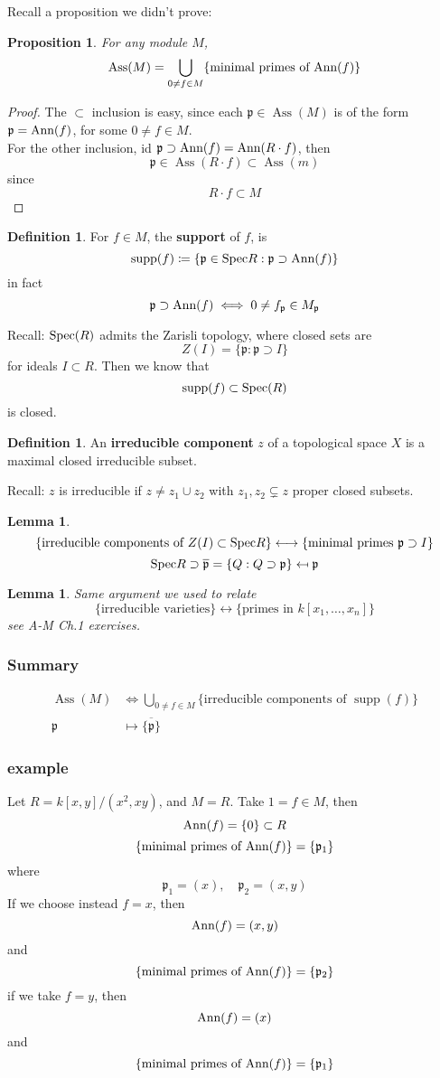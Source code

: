 \documentclass[12pt]{article}
\newcommand{\spec}{\textup{Spec}}
\newcommand{\ann}[1]{\textup{Ann}(#1)}
\DeclareMathOperator{\Ass}{Ass}
\DeclareMathOperator{\supp}{supp}
\def\p{\mathfrak{p}}
\newtheorem{lemma}[theorem]{Lemma}
\newtheorem{prop}[theorem]{Proposition}
\theoremstyle{definition}
\newtheorem{definition}[theorem]{Definition}
\begin{document}
Recall a proposition we didn't prove:
\begin{prop}
For any module $M$,
\[
\Ass(M) = \bigcup_{0\neq f \in M}\{ \text{minimal primes of }\ann{f}\}
\]
\end{prop}
\begin{proof}
The $\subset $ inclusion is easy, since each $\p \in \Ass(M)$ is of the form $\p = \ann{f}$, for some $0\neq f \in M$.\\
For the other inclusion, id $\p \supset \ann{f} = \ann{R\cdot f}$, then
\[
\p \in \Ass(R\cdot f) \subset \Ass(m)
\]
since
\[
R\cdot f \subset M
\]
\end{proof}
\begin{definition}
For $f\in M$, the \textbf{support} of $f$, is
\[
\supp(f)\coloneqq\{\p \in \spec{R}: \p \supset \ann{f}\}
\]
in fact
\[
\p \supset \ann{f} \iff 0\neq f_\p \in M_\p
\]
\end{definition}
Recall: $\spec(R)$ admits the Zarisli topology, where closed sets are
\[
Z(I) = \{\p : \p\supset I\}
\]
for ideals $I \subset R$. Then we know that
\[
\supp(f) \subset \spec(R)
\]
is closed.\\
\begin{definition}
An \textbf{irreducible component} $z$ of a topological space $X$ is a maximal closed irreducible subset.
\end{definition}
Recall: $z$ is irreducible if $z\neq z_1 \cup z_2$ with $z_1,z_2 \subsetneq z$ proper closed subsets. 
\begin{lemma}
\[
\{\text{irreducible components of }Z(I) \subset \spec{R}\} \longleftrightarrow \{\text{minimal primes }\p\supset I\}
\]
\[
\spec{R} \supset \overline{\p} = \{Q: Q\supset \p\} \mapsfrom \p
\]
\end{lemma}
\begin{lemma}
Same argument we used to relate 
\[
\{\text{irreducible varieties}\} \longleftrightarrow \{\text{primes in } k[x_1,\dots, x_n]\}
\]
see A-M Ch.1 exercises.
\end{lemma}
\subsubsection*{Summary}
\begin{align}
    \Ass(M) &\Longleftrightarrow \bigcup_{0\neq f \in M}\{\text{irreducible components of }\supp(f)\}\\
    \p &\mapsto \overline{\{\p\}}
\end{align}

\subsubsection*{example}
Let $R = k[x,y]/(x^2,xy)$, and $M= R$. Take $1=f \in M$, then
\[
\ann{f} = \{0\} \subset R
\]
\[
\{\text{minimal primes of }\ann{f}\} = \{\p_1\}
\]
where
\[
\p_1 = (x), \quad \p_2 =(x,y)
\]
If we choose instead $f=x$, then
\[
\ann{f} = (x,y)
\]
and
\[
\{\text{minimal primes of }\ann{f}\} = \{\p_2\}
\]
if we take $f=y$, then 
\[
\ann{f} = (x)
\]
and
\[
\{\text{minimal primes of }\ann{f}\} = \{\p_1\}
\]
\end{document}
